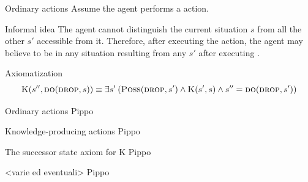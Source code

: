 \begin{frame}{Ordinary actions}
    Assume the agent performs a  action.

    \begin{block}{Informal idea}
        The agent cannot distinguish the current situation \(s\) from all the other
        \(s'\) accessible from it. Therefore, after executing the action,
        the agent may believe to be in any situation resulting from any \(s'\) after executing .
    \end{block}

    \begin{block}{Axiomatization}
        \[ \textsc{K}(s'', \textsc{do}(\textsc{drop}, s)) \equiv \exists s' \: (\textsc{Poss}(\textsc{drop}, s') \land \textsc{K}(s',s) \land s'' = \textsc{do}(\textsc{drop}, s')) \]
    \end{block}
\end{frame}

\begin{frame}{Ordinary actions}
    Pippo
\end{frame}

\begin{frame}{Knowledge-producing actions}
    Pippo
\end{frame}

\begin{frame}{The successor state axiom for K}
    Pippo
\end{frame}

\begin{frame}{<varie ed eventuali>}
    Pippo
\end{frame}
